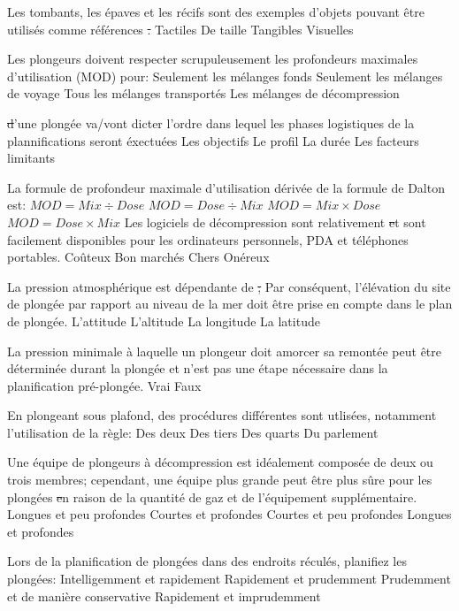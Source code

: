 \documentclass[english,10pt,twoside]{article}
\begin{document}
\begin{outline}
		\1 Les tombants, les épaves et les récifs sont des exemples d'objets pouvant être utilisés comme références \st.
			\2 Tactiles
			\2 De taille
			\2 Tangibles
			\2 Visuelles

		\1 Les plongeurs doivent respecter scrupuleusement les profondeurs maximales d'utilisation (MOD) pour:
			\2 Seulement les mélanges fonds
			\2 Seulement les mélanges de voyage
			\2 Tous les mélanges transportés
			\2 Les mélanges de décompression

		\1 \st d'une plongée va/vont dicter l'ordre dans lequel les phases logistiques de la plannifications seront éxectuées
			\2 Les objectifs
			\2 Le profil
			\2 La durée
			\2 Les facteurs limitants

		\1 La formule de profondeur maximale d'utilisation dérivée de la formule de Dalton est:
			\2 $MOD = Mix \div Dose$
			\2 $MOD = Dose \div Mix$
			\2 $MOD = Mix \times Dose$
			\2 $MOD = Dose \times Mix$
		\1 Les logiciels de décompression sont relativement \st et sont facilement disponibles pour les ordinateurs personnels, PDA et téléphones portables.
			\2 Coûteux
			\2 Bon marchés
			\2 Chers
			\2 Onéreux

		\1 La pression atmosphérique est dépendante de \st; Par conséquent, l'élévation du site de plongée par rapport au niveau de la mer doit être prise en compte dans le plan de plongée.
			\2 L'attitude
			\2 L'altitude
			\2 La longitude
			\2 La latitude

		\1 La pression minimale à laquelle un plongeur doit amorcer sa remontée peut être déterminée durant la plongée et n'est pas une étape nécessaire dans la planification pré-plongée.
			\2 Vrai
			\2 Faux

		\1 En plongeant sous plafond, des procédures différentes sont utlisées, notamment l'utilisation de la règle:
			\2 Des deux
			\2 Des tiers
			\2 Des quarts
			\2 Du parlement

		\1 Une équipe de plongeurs à décompression est idéalement composée de deux ou trois membres; cependant, une équipe plus grande peut être plus sûre pour les plongées \st en raison de la quantité de gaz et de l'équipement supplémentaire.
			\2 Longues et peu profondes
			\2 Courtes et profondes
			\2 Courtes et peu profondes
			\2 Longues et profondes

		\1 Lors de la planification de plongées dans des endroits réculés, planifiez les plongées:
			\2 Intelligemment et rapidement
			\2 Rapidement et prudemment
			\2 Prudemment et de manière conservative
			\2 Rapidement et imprudemment


\end{outline}
\end{document}
